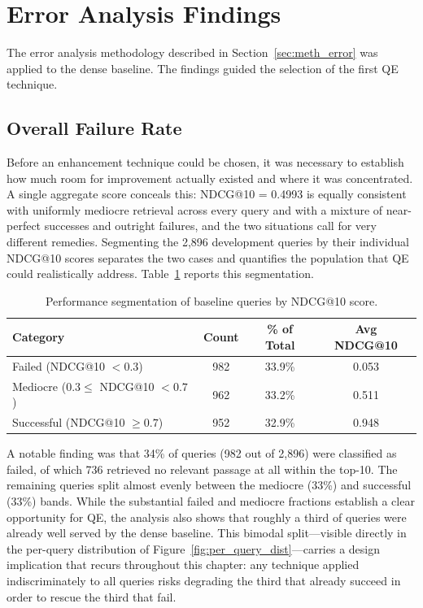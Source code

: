 \section{Error Analysis Findings}
\label{sec:res_error}

The error analysis methodology described in Section~\ref{sec:meth_error} was applied to the dense baseline. The findings guided the selection of the first QE technique.

\subsection{Overall Failure Rate}
\label{sec:res_error_rate}

Before an enhancement technique could be chosen, it was necessary to establish how much room for improvement actually existed and where it was concentrated. A single aggregate score conceals this: NDCG@10 = 0.4993 is equally consistent with uniformly mediocre retrieval across every query and with a mixture of near-perfect successes and outright failures, and the two situations call for very different remedies. Segmenting the 2,896 development queries by their individual NDCG@10 scores separates the two cases and quantifies the population that QE could realistically address. Table~\ref{tab:error_segmentation} reports this segmentation.

\begin{table}[htbp]
    \centering
    \caption[Baseline query performance segmentation]{Performance segmentation of baseline queries by NDCG@10 score.}
    \label{tab:error_segmentation}
    \begin{tabular}{@{}lccc@{}}
        \toprule
        \textbf{Category} & \textbf{Count} & \textbf{\% of Total} & \textbf{Avg NDCG@10} \\
        \midrule
        Failed (NDCG@10 $< 0.3$) & 982 & 33.9\% & 0.053 \\
        Mediocre ($0.3 \leq$ NDCG@10 $< 0.7$) & 962 & 33.2\% & 0.511 \\
        Successful (NDCG@10 $\geq 0.7$) & 952 & 32.9\% & 0.948 \\
        \bottomrule
    \end{tabular}
\end{table}

A notable finding was that 34\% of queries (982 out of 2,896) were classified as failed, of which 736 retrieved no relevant passage at all within the top-10. The remaining queries split almost evenly between the mediocre (33\%) and successful (33\%) bands. While the substantial failed and mediocre fractions establish a clear opportunity for QE, the analysis also shows that roughly a third of queries were already well served by the dense baseline. This bimodal split---visible directly in the per-query distribution of Figure~\ref{fig:per_query_dist}---carries a design implication that recurs throughout this chapter: any technique applied indiscriminately to all queries risks degrading the third that already succeed in order to rescue the third that fail.

